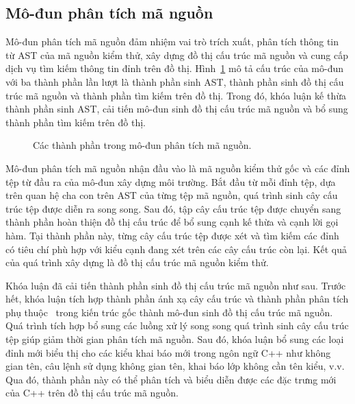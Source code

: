 \subsection{Mô-đun phân tích mã nguồn}\label{sec:module-analyze}
Mô-đun phân tích mã nguồn đảm nhiệm vai trò trích xuất, phân tích thông tin từ AST của mã nguồn kiểm thử, xây dựng đồ thị cấu trúc mã nguồn và cung cấp dịch vụ tìm kiếm thông tin đỉnh trên đồ thị. Hình~\ref{fig:module-analyze} mô tả cấu trúc của mô-đun với ba thành phần lần lượt là thành phần sinh AST, thành phần sinh đồ thị cấu trúc mã nguồn và thành phần tìm kiếm trên đồ thị. Trong đó, khóa luận kế thừa thành phần sinh AST, cải tiến mô-đun sinh đồ thị cấu trúc mã nguồn và bổ sung thành phần tìm kiếm trên đồ thị.
\vspace{5mm}
\begin{figure}[h]
    \centering
    
    \caption{Các thành phần trong mô-đun phân tích mã nguồn.}
    \label{fig:module-analyze}
\end{figure}

Mô-đun phân tích mã nguồn nhận đầu vào là mã nguồn kiểm thử gốc và các đỉnh tệp từ đầu ra của mô-đun xây dựng môi trường. Bắt đầu từ mỗi đỉnh tệp, dựa trên quan hệ cha con trên AST của từng tệp mã nguồn, quá trình sinh cây cấu trúc tệp được diễn ra song song. Sau đó, tập cây cấu trúc tệp được chuyển sang thành phần hoàn thiện đồ thị cấu trúc để bổ sung cạnh kế thừa và cạnh lời gọi hàm. Tại thành phần này, từng cây cấu trúc tệp được xét và tìm kiếm các đỉnh có tiêu chí phù hợp với kiểu cạnh đang xét trên các cây cấu trúc còn lại. Kết quả của quá trình xây dựng là đồ thị cấu trúc mã nguồn kiểm thử.

Khóa luận đã cải tiến thành phần sinh đồ thị cấu trúc mã nguồn như sau. Trước hết, khóa luận tích hợp thành phần ánh xạ cây cấu trúc và thành phần phân tích phụ thuộc~\cite{TUNG2022106821} trong kiến trúc gốc thành mô-đun sinh đồ thị cấu trúc mã nguồn. Quá trình tích hợp bổ sung các luồng xử lý song song quá trình sinh cây cấu trúc tệp giúp giảm thời gian phân tích mã nguồn. Sau đó, khóa luận bổ sung các loại đỉnh mới biểu thị cho các kiểu khai báo mới trong ngôn ngữ C++ như không gian tên, câu lệnh sử dụng không gian tên, khai báo lớp không cần tên kiểu, v.v. Qua đó, thành phần này có thể phân tích và biểu diễn được các đặc trưng mới của C++ trên đồ thị cấu trúc mã nguồn.\\

